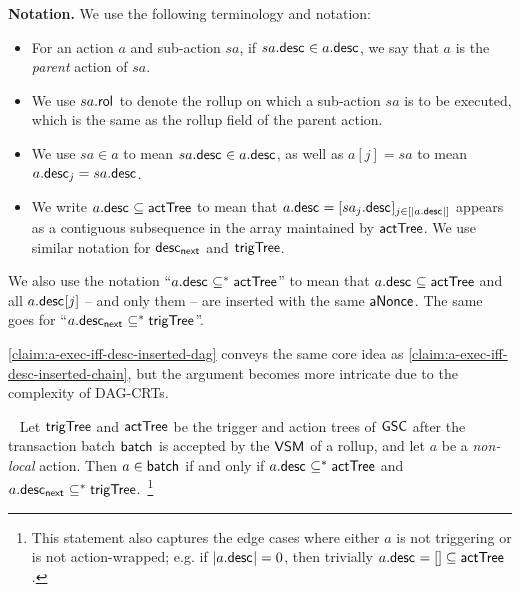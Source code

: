 \noindent\textbf{Notation.} We use the following terminology and notation:
\begin{itemize}[leftmargin=*]
    \item For an action $a$ and sub-action $sa$, if $sa.\mathsf{desc}_{} \in a.\mathsf{desc}_{}$, we say that $a$ is the \emph{parent} action of $sa$.   
    \item We use $sa.\mathsf{rol}_{}$ to denote the rollup on which a sub-action $sa$ is to be executed, which is the same as the rollup field of the parent action.
    \item We use $sa \in a$ to mean $sa.\mathsf{desc}_{} \in a.\mathsf{desc}_{}$, as well as $a[j] = sa$ to mean $a.\mathsf{desc}_{j} = sa.\mathsf{desc}_{}$.
    \item We write $a.\mathsf{desc}_{} \subseteq \mathsf{actTree}$ to mean that $a.\mathsf{desc}_{} = [sa_j.\mathsf{desc}_{}]_{j \in [|a.\mathsf{desc}_{}|]}$ appears as a contiguous subsequence in the array maintained by $\mathsf{actTree}$. We use similar notation for $\mathsf{desc_{next}}_{}$ and $\mathsf{trigTree}$.  
\end{itemize} 

We also use the notation ``$a.\mathsf{desc}_{} \subseteq^* \mathsf{actTree}$'' to mean that $a.\mathsf{desc}_{} \subseteq \mathsf{actTree}$ and all $a.\mathsf{desc}_{}[j]$ -- and only them --  are inserted with the same $\mathsf{aNonce_{}}$. The same goes for ``$a.\mathsf{desc_{next}}_{} \subseteq^* \mathsf{trigTree}$''.

    


\cref{claim:a-exec-iff-desc-inserted-dag} conveys the same core idea as \cref{claim:a-exec-iff-desc-inserted-chain}, but the argument becomes more intricate due to the complexity of DAG-CRTs.


\begin{claim}~\label{claim:a-exec-iff-desc-inserted-dag}
    Let $\mathsf{trigTree}$ and $\mathsf{actTree}$ be the trigger and action trees of $\mathsf{GSC}$ after the transaction batch $\mathsf{batch}_{}$ is accepted by the $\mathsf{VSM}_{}$ of a rollup, and let $a$ be a \emph{non-local} action. Then $a \in \mathsf{batch}_{}$ if and only if $a.\mathsf{desc}_{} \subseteq^* \mathsf{actTree}$ and $a.\mathsf{desc_{next}}_{} \subseteq^* \mathsf{trigTree}$.~\footnote{This statement also captures the edge cases where either $a$ is not triggering or is not action-wrapped; e.g. if $|a.\mathsf{desc}_{}| = 0$, then trivially $a.\mathsf{desc}_{} = [] \subseteq \mathsf{actTree}$.}
\end{claim}

